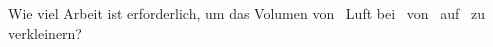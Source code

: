Wie viel Arbeit ist erforderlich, um das Volumen von \nLuO\ Luft bei \TLO\ von \VaO\ auf \VbO\ zu verkleinern?
